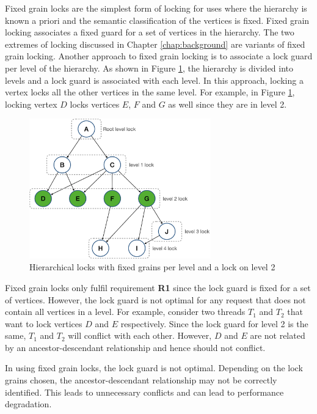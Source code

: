 Fixed grain locks are the simplest form of locking for uses where the hierarchy is known a priori and the semantic classification of the vertices is fixed. 
Fixed grain locking associates a fixed guard for a set of vertices in the hierarchy.
The two extremes of locking discussed in Chapter \ref{chap:background} are variants of fixed grain locking. 
Another approach to fixed grain locking is to associate a lock guard per level of the hierarchy. 
As shown in Figure \ref{fig:level_locks}, the hierarchy is divided into levels and a lock guard is associated with each level. 
In this approach, locking a vertex locks all the other vertices in the same level. 
For example, in Figure \ref{fig:level_locks}, locking vertex $D$ locks vertices $E$, $F$ and $G$ as well since they are in level 2.

\begin{figure}
    \centering
    \captionsetup{justification=centering}
    \includegraphics[width=0.7\textwidth]{figures/FixedGrainLevelLocks.png}
    \caption{Hierarchical locks with fixed grains per level and a lock on level 2}
    \label{fig:level_locks}
\end{figure}

Fixed grain locks only fulfil requirement \textbf{R1} since the lock guard is fixed for a set of vertices. 
However, the lock guard is not optimal for any request that does not contain all vertices in a level. 
For example, consider two threads $T_1$ and $T_2$ that want to lock vertices $D$ and $E$ respectively.
Since the lock guard for level 2 is the same, $T_1$ and $T_2$ will conflict with each other. 
However, $D$ and $E$ are not related by an ancestor-descendant relationship and hence should not conflict.

In using fixed grain locks, the lock guard is not optimal. 
Depending on the lock grains chosen, the ancestor-descendant relationship may not be correctly identified. 
This leads to unnecessary conflicts and can lead to performance degradation.

